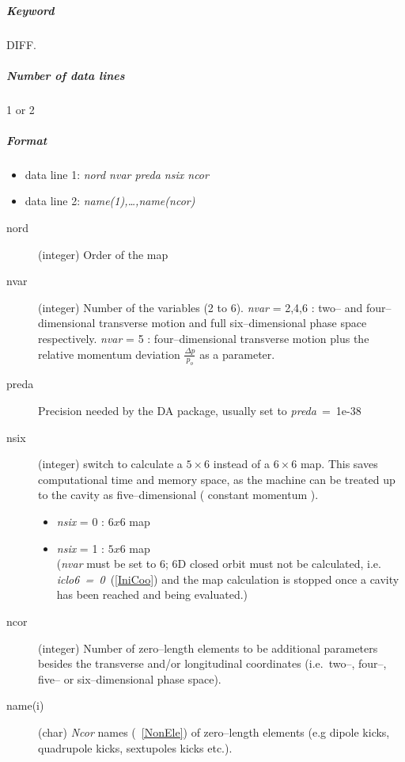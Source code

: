 \documentclass[a4paper,11pt]{report}
\begin{document}
\subparagraph{Keyword} DIFF.  \subparagraph{Number of data lines} 1 or
2

\subparagraph{Format}
\begin{itemize}
\item data line 1: {\em nord nvar preda nsix ncor}
\item data line 2: {\em name(1),\ldots,name(ncor)}
\end{itemize}

\begin{description}
\item [nord] (integer) Order of the map
\item [nvar] (integer) Number of the variables (2 to 6).  {\em nvar}
  \/= 2,4,6 : two-- and four--dimensional transverse motion and full
  six--dimensional phase space respectively.  {\em nvar} \/= 5 :
  four--dimensional transverse motion plus the relative momentum
  deviation \mbox{$ \frac{\Delta p}{p_o} $} as a parameter.
\item [preda] Precision needed by the DA package, usually set to
  \mbox{{\em preda} \/= 1e-38}
\item [nsix] (integer) switch to calculate a $ 5 \times 6 $ instead of a $
  6 \times 6 $ map. This saves computational time and memory space, as the
  machine can be treated up to the cavity as five--dimensional (
  constant momentum ).

 \begin{itemize}
 \item {\em nsix} \/= 0 : $ 6x6 $ map
 \item {\em nsix} \/= 1 : $ 5x6 $ map \\
   ({\em nvar} \/must be set to 6; 6D closed orbit must not be
   calculated, i.e. \mbox{\em iclo6 = 0}~(\ref{IniCoo}) and the map
   calculation is stopped once a cavity has been reached and being
   evaluated.)
 \end{itemize}
\item [ncor] (integer) Number of zero--length elements to be
  additional parameters besides the transverse and/or longitudinal
  coordinates (i.e.\ two--, four--, five-- or six--dimensional phase
  space).
\item [name(i)] (char) {\em Ncor} \/names (~\ref{NonEle}) of
  zero--length elements (e.g dipole kicks, quadrupole kicks,
  sextupoles kicks etc.).
\end{description}
\end{document}
